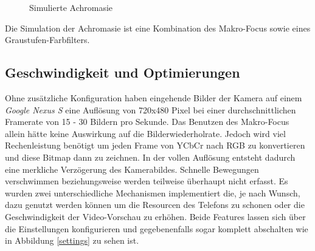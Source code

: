 \documentclass[a4paper]{article}
\begin{document}
\begin{figure}[H]
\centering
{}
\caption{Simulierte Achromasie}
\end{figure}

Die Simulation der Achromasie ist eine Kombination des Makro-Focus sowie eines Graustufen-Farbfilters.

\newpage

\subsection*{Geschwindigkeit und Optimierungen}
Ohne zusätzliche Konfiguration haben eingehende Bilder der Kamera auf einem \textit{Google Nexus S} eine Auflösung von 720x480 Pixel bei einer durchschnittlichen Framerate von 15 - 30 Bildern pro Sekunde. Das Benutzen des Makro-Focus allein hätte keine Auswirkung auf die Bilderwiederholrate. Jedoch wird viel Rechenleistung benötigt um jeden Frame von YCbCr nach RGB zu konvertieren und diese Bitmap dann zu zeichnen. In der vollen Auflösung entsteht dadurch eine merkliche Verzögerung des Kamerabildes. Schnelle Bewegungen verschwimmen beziehungsweise werden teilweise überhaupt nicht erfasst. Es wurden zwei unterschiedliche Mechanismen implementiert die, je nach Wunsch, dazu genutzt werden können um die Resourcen des Telefons zu schonen oder die Geschwindigkeit der Video-Vorschau zu erhöhen. Beide Features lassen sich über die Einstellungen konfigurieren und gegebenenfalls sogar komplett abschalten wie in Abbildung \ref{settings} zu sehen ist.
\end{document}

